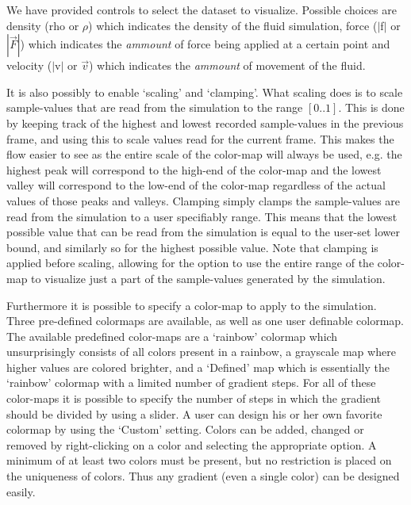 \documentclass[a4paper,11pt,twoside]{report}
\begin{document}
		We have provided controls to select the dataset to visualize. Possible choices are density (rho or $\rho$) which indicates the density of the fluid simulation, force ($|$f$|$ or $|\overrightarrow{F}|$) which indicates the \emph{ammount} of force being applied at a certain point and velocity ($|$v$|$ or $\overrightarrow{v}$) which indicates the \emph{ammount} of movement of the fluid.

		It is also possibly to enable `scaling' and `clamping'. What scaling does is to scale sample-values that are read from the simulation to the range $[0..1]$. This is done by keeping track of the highest and lowest recorded sample-values in the previous frame, and using this to scale values read for the current frame. This makes the flow easier to see as the entire scale of the color-map will always be used, e.g. the highest peak will correspond to the high-end of the color-map and the lowest valley will correspond to the low-end of the color-map regardless of the actual values of those peaks and valleys.
		Clamping simply clamps the sample-values are read from the simulation to a user specifiably range. This means that the lowest possible value that can be read from the simulation is equal to the user-set lower bound, and similarly so for the highest possible value.
		Note that clamping is applied before scaling, allowing for the option to use the entire range of the color-map to visualize just a part of the sample-values generated by the simulation.

		Furthermore it is possible to specify a color-map to apply to the simulation. Three pre-defined colormaps are available, as well as one user definable colormap. The available predefined color-maps are a `rainbow' colormap which unsurprisingly consists of all colors present in a rainbow, a grayscale map where higher values are colored brighter, and a `Defined' map which is essentially the `rainbow' colormap with a limited number of gradient steps. For all of these color-maps it is possible to specify the number of steps in which the gradient should be divided by using a slider.
		A user can design his or her own favorite colormap by using the `Custom' setting. Colors can be added, changed or removed by right-clicking on a color and selecting the appropriate option. A minimum of at least two colors must be present, but no restriction is placed on the uniqueness of colors. Thus any gradient (even a single color) can be designed easily.
\end{document}
